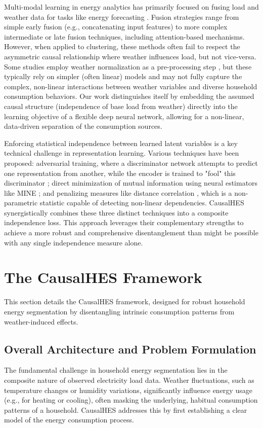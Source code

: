 \documentclass[journal]{IEEEtran}
\begin{document}
Multi-modal learning in energy analytics has primarily focused on fusing load and weather data for tasks like energy forecasting \cite{energy_forecasting_survey}. Fusion strategies range from simple early fusion (e.g., concatenating input features) to more complex intermediate or late fusion techniques, including attention-based mechanisms. However, when applied to clustering, these methods often fail to respect the asymmetric causal relationship where weather influences load, but not vice-versa. Some studies employ weather normalization as a pre-processing step \cite{weather_normalization_energy}, but these typically rely on simpler (often linear) models and may not fully capture the complex, non-linear interactions between weather variables and diverse household consumption behaviors. Our work distinguishes itself by embedding the assumed causal structure (independence of base load from weather) directly into the learning objective of a flexible deep neural network, allowing for a non-linear, data-driven separation of the consumption sources.

Enforcing statistical independence between learned latent variables is a key technical challenge in representation learning. Various techniques have been proposed: adversarial training, where a discriminator network attempts to predict one representation from another, while the encoder is trained to "fool" this discriminator \cite{adversarial_independence}; direct minimization of mutual information using neural estimators like MINE \cite{belghazi2018mine}; and penalizing measures like distance correlation \cite{szekely2007measuring}, which is a non-parametric statistic capable of detecting non-linear dependencies. CausalHES synergistically combines these three distinct techniques into a composite independence loss. This approach leverages their complementary strengths to achieve a more robust and comprehensive disentanglement than might be possible with any single independence measure alone.

\section{The CausalHES Framework}
    This section details the CausalHES framework, designed for robust household energy segmentation
    by disentangling intrinsic consumption patterns from weather-induced effects.

\subsection{Overall Architecture and Problem Formulation}
The fundamental challenge in household energy segmentation lies in the composite nature of observed electricity load data. Weather fluctuations, such as temperature changes or humidity variations, significantly influence energy usage (e.g., for heating or cooling), often masking the underlying, habitual consumption patterns of a household. CausalHES addresses this by first establishing a clear model of the energy consumption process.
\end{document}
